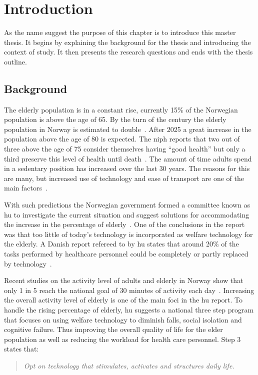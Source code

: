 \chapter{Introduction}
As the name suggest the purpose of this chapter is to introduce this master thesis. It begins by explaining the background for the thesis and introducing the context of study. It then presents the research questions and ends with the thesis outline.

\section{Background}
The elderly population is in a constant rise, currently 15\% of the Norwegian population is above the age of 65. By the turn of the century the elderly population in Norway is estimated to double~\cite{elder}. After 2025 a great increase in the population above the age of 80 is expected. The \gls{niph} reports that two out of three above the age of 75 consider themselves having ``good health'' but only a third preserve this level of health until death~\cite{elder}. The amount of time adults spend in a sedentary position has increased over the last 30 years. The reasons for this are many, but increased use of technology and ease of transport are one of the main factors~\cite{sedentaryBehaviour}.

With such predictions the Norwegian government formed a committee known as \gls{hu} to investigate the current situation and suggest solutions for accommodating the increase in the percentage of elderly~\cite{haagen}. One of the conclusions in the report was that too little of today's technology is incorporated as welfare technology for the elderly. A Danish report refereed to by \gls{hu} states that around 20\% of the tasks performed by healthcare personnel could be completely or partly replaced by technology~\cite{kmd}. 

Recent studies on the activity level of adults and elderly in Norway show that only 1 in 5 reach the national goal of 30 minutes of activity each day~\cite{fysiskAktivitet2009}. Increasing the overall activity level of elderly is one of the main foci in the \gls{hu} report. To handle the rising percentage of elderly, \gls{hu} suggests a national three step program that focuses on using welfare technology to diminish falls, social isolation and cognitive failure. Thus improving the overall quality of life for the elder population as well as reducing the workload for health care personnel. Step 3 states that:
\begin{quote}
\textit{Opt on technology that stimulates, activates and structures daily life.}
\end{quote}

